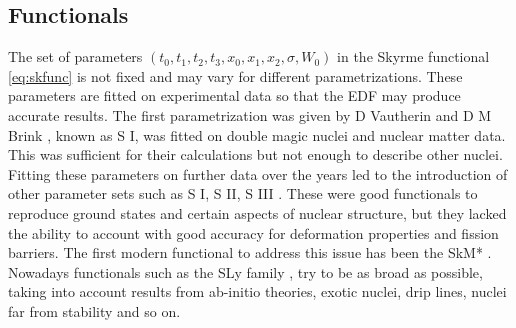 \subsection{Functionals}
The set of parameters $(t_0, t_1, t_2, t_3, x_0, x_1, x_2, \sigma, W_0)$ in the Skyrme functional \eqref{eq:skfunc} is not fixed and may vary for different parametrizations. These parameters are fitted on experimental data so that the EDF may produce accurate results.
The first parametrization was given by D Vautherin and D M Brink \cite{VauhBrinkOriginal}, known as S I, was fitted on double magic nuclei and nuclear matter data. This was sufficient for their calculations but not enough to describe other nuclei. Fitting these parameters on further data over the years led to the introduction of other parameter sets such as S I, S II, S III \cite{CHABANAT1997710}. These were good functionals to reproduce ground states and certain aspects of nuclear structure, but they lacked the ability to account with good accuracy for deformation properties and fission barriers. The first modern functional to address this issue has been the SkM* \cite{bartel1982fission}.
Nowadays functionals such as the SLy family \cite{chabanat2}, try to be as broad as possible, taking into account results from ab-initio theories, exotic nuclei, drip lines, nuclei far from stability and so on.
